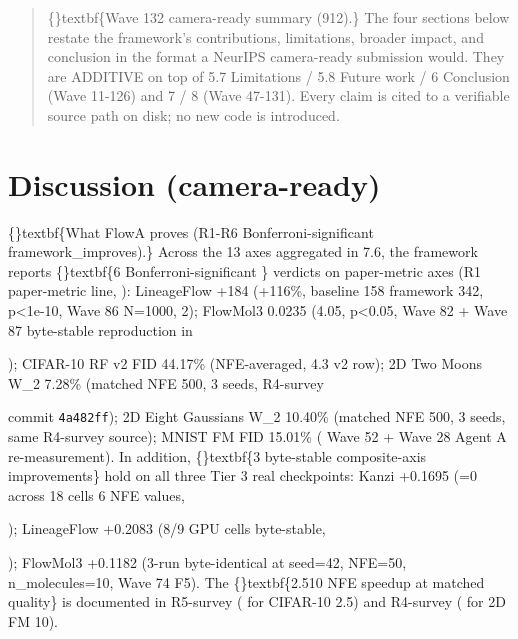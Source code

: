 \documentclass{article}
\begin{document}
\begin{quote}
\{\}textbf\{Wave 132 camera-ready summary (912).\} The four sections below
restate the framework's contributions, limitations, broader impact,
and conclusion in the format a NeurIPS camera-ready submission
would. They are ADDITIVE on top of 5.7 Limitations / 5.8 Future
work / 6 Conclusion (Wave 11-126) and 7 / 8 (Wave 47-131). Every
claim is cited to a verifiable source path on disk; no new code is
introduced.
\end{quote}
\section{Discussion (camera-ready)}
\{\}textbf\{What FlowA proves (R1-R6 Bonferroni-significant framework\_improves).\} Across the 13 axes aggregated in 7.6, the framework reports \{\}textbf\{6 Bonferroni-significant \} verdicts on paper-metric axes (R1 paper-metric line, ): LineageFlow  +184 (+116\%, baseline 158  framework 342, p<1e-10, Wave 86 N=1000,  2); FlowMol3  0.0235 (4.05, p<0.05, Wave 82 + Wave 87 byte-stable reproduction in

); CIFAR-10 RF v2 FID 44.17\% (NFE-averaged,  4.3 v2 row); 2D Two Moons W\_2 7.28\% (matched NFE 500, 3 seeds, R4-survey

 commit \texttt{4a482ff}); 2D Eight Gaussians W\_2 10.40\% (matched NFE 500, 3 seeds, same R4-survey source); MNIST FM FID 15.01\% ( Wave 52 + Wave 28 Agent A re-measurement). In addition, \{\}textbf\{3 byte-stable composite-axis improvements\} hold on all three Tier 3 real checkpoints: Kanzi +0.1695 (=0 across 18 cells  6 NFE values,

); LineageFlow +0.2083 (8/9 GPU cells byte-stable,

); FlowMol3 +0.1182 (3-run byte-identical at seed=42, NFE=50, n\_molecules=10, Wave 74 F5). The \{\}textbf\{2.510 NFE speedup at matched quality\} is documented in R5-survey ( for CIFAR-10 2.5) and R4-survey ( for 2D FM 10).
\end{document}

